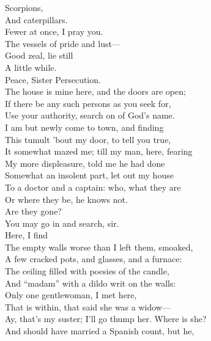 \documentclass[a4paper,oneside,12pt]{memoir}
\begin{document}
\begin{drama*}
\persecutionspeaks {} Scorpions,\\
And caterpillars.\\
\lovewitspeaks {} Fewer at once, I pray you.\\
\persecutionspeaks The vessels of pride and lust---\\
\lovewitspeaks {} Good zeal, lie still\\
A little while.\\
\tribulationspeaks {} Peace, Sister Persecution.\\
\lovewitspeaks The house is mine here, and the doors are open;\\
If there be any such persons as you seek for,\\
Use your authority, search on of God's name.\\
I am but newly come to town, and finding\\
This tumult 'bout my door, to tell you true,\\
It somewhat mazed me; till my man, here, fearing\\
My more displeasure, told me he had done\\
Somewhat an insolent part, let out my house\\
To a doctor and a captain: who, what they are\\
Or where they be, he knows not.\\
\mammonspeaks {} Are they gone?\\
\lovewitspeaks You may go in and search, sir.\\
 Here, I find\\
The empty walls worse than I left them, smoaked,\\
A few cracked pots, and glasses, and a furnace:\\
The ceiling filled with poesies of the candle,\\
And ``madam'' with a dildo writ on the walls:\\
Only one gentlewoman, I met here,\\
That is within, that said she was a widow---\\
\kastrilspeaks Ay, that's my suster; I'll go thump her. Where is she?\\
\lovewitspeaks And should have married a Spanish count, but he,\\

\end{drama*}
\end{document}
